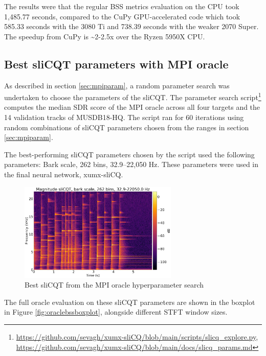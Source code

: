 \documentclass[report.tex]{subfiles}
\begin{document}
The results were that the regular BSS metrics evaluation on the CPU took 1,485.77 seconds, compared to the CuPy GPU-accelerated code which took 585.33 seconds with the 3080 Ti and 738.39 seconds with the weaker 2070 Super. The speedup from CuPy is \textasciitilde 2-2.5x over the Ryzen 5950X CPU.

\newpagefill

\subsection{Best sliCQT parameters with MPI oracle}

As described in section \ref{sec:mpiparam}, a random parameter search was undertaken to choose the parameters of the sliCQT. The parameter search script\footnote{\url{https://github.com/sevagh/xumx-sliCQ/blob/main/scripts/slicq_explore.py}, \url{https://github.com/sevagh/xumx-sliCQ/blob/main/docs/slicq_params.md}} computes the median SDR score of the MPI oracle across all four targets and the 14 validation tracks of MUSDB18-HQ. The script ran for 60 iterations using random combinations of sliCQT parameters chosen from the ranges in section \ref{sec:mpiparam}.

The best-performing sliCQT parameters chosen by the script used the following parameters: Bark scale, 262 bins, 32.9--22,050 Hz. These parameters were used in the final neural network, xumx-sliCQ.

\begin{figure}[ht]
	\centering
	\includegraphics[width=0.675\textwidth]{./images-gspi/slicqt_good.png}
	\caption{Best sliCQT from the MPI oracle hyperparameter search}
	\label{fig:bipolarslicqs}
\end{figure}

The full oracle evaluation on these sliCQT parameters are shown in the boxplot in Figure \ref{fig:oraclebssboxplot}, alongside different STFT window sizes.
\end{document}
